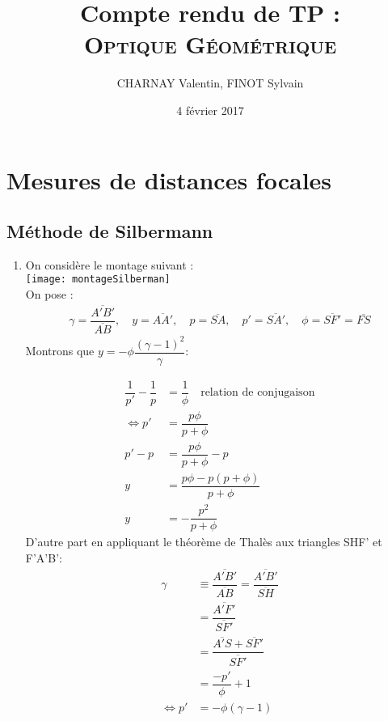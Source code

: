 \documentclass[12pt,a4paper]{article}
\author{CHARNAY Valentin, FINOT Sylvain}
\title{Compte rendu de TP :\\ \scshape Optique Géométrique}
\date{4 février 2017}
\begin{document}
	\maketitle
	\section{Mesures de distances focales}
	\subsection{Méthode de Silbermann}
	\begin{enumerate}
		\item 
		On considère le montage suivant :\\
		\texttt{[image: montageSilberman]}\\
		On pose : 
		$$
		\begin{aligned}
		\gamma = \dfrac{\overline{A'B'}}{\overline{AB}} ,\quad y=\overline{AA'},\quad p=\overline{SA},\quad p'=\overline{SA'},\quad \phi=\overline{SF'}=\overline{FS}
		\end{aligned}
		$$
		Montrons que $y=-\phi\dfrac{{(\gamma-1)}^2}{\gamma}$:
		\begin{multicols}{2}
			\begingroup
			\addtolength{\jot}{1em}
			\noindent
			\begin{align*}
			\dfrac{1}{p'}-\dfrac{1}{p}&=\dfrac{1}{\phi}\quad \text{relation de conjugaison}\\
			\iff p'&=\dfrac{p\phi}{p+\phi}\\
			p'-p &= \dfrac{p\phi}{p+\phi}-p\\
			y &= \dfrac{p\phi-p(p+\phi)}{p+\phi}\\
			y&=-\dfrac{p^2}{p+\phi}
			\end{align*}
			\endgroup
			\setlength\columnseprule{0.4pt}
			\vfill
			\columnbreak
			D'autre part en appliquant le théorème de Thalès aux triangles SHF' et F'A'B':
			\begingroup
			\addtolength{\jot}{1em}
			\noindent
			\begin{align*}
			\gamma&\equiv\dfrac{\overline{A'B'}}{\overline{AB}} = \dfrac{\overline{A'B'}}{\overline{SH}}\\
			&=\dfrac{\overline{A'F'}}{\overline{SF'}}\\
			&=\dfrac{\overline{A'S}+\overline{SF'}}{\overline{SF'}}\\
			&=\dfrac{-p'}{\phi}+1\\
			\iff p' &= -\phi(\gamma-1)
			\end{align*}
			\endgroup
		\end{multicols}

\end{enumerate}
\end{document}
